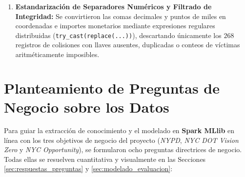 \documentclass[11pt,a4paper]{article}
\begin{document}
\begin{enumerate}
    \item \textbf{Estandarización de Separadores Numéricos y Filtrado de Integridad:} Se convirtieron las comas decimales y puntos de miles en coordenadas e importes monetarios mediante expresiones regulares distribuidas (\texttt{try\_cast(replace(...))}), descartando únicamente los $268$ registros de colisiones con llaves ausentes, duplicadas o conteos de víctimas aritméticamente imposibles.
\end{enumerate}



\section{Planteamiento de Preguntas de Negocio sobre los Datos}
\label{sec:preguntas_negocio}

Para guiar la extracción de conocimiento y el modelado en \textbf{Spark MLlib} en línea con los tres objetivos de negocio del proyecto (\textit{NYPD}, \textit{NYC DOT Vision Zero} y \textit{NYC Opportunity}), se formularon ocho preguntas directrices de negocio. Todas ellas se resuelven cuantitativa y visualmente en las Secciones \ref{sec:respuestas_preguntas} y \ref{sec:modelado_evaluacion}:
\end{document}

